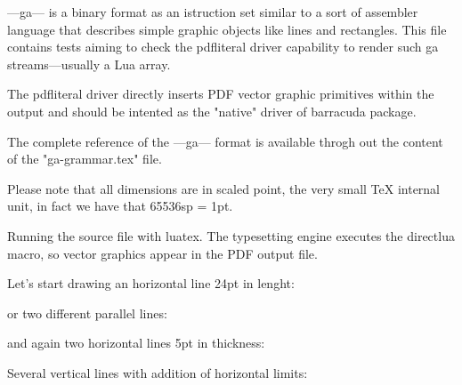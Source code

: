 %

---ga--- is a binary format as an istruction set similar to
a sort of assembler language that describes simple graphic
objects like lines and rectangles.
This file contains tests aiming to check the pdfliteral
driver capability to render such ga streams---usually a Lua
array.

The pdfliteral driver directly inserts PDF vector graphic
primitives within the output and should be intented as the
"native" driver of barracuda package.

The complete reference of the ---ga--- format is available
throgh out the content of the "ga-grammar.tex" file.

Please note that all dimensions are in scaled point, the
very small \TeX{} internal unit, in fact we have that
65536sp = 1pt.

Running the source file with luatex. The typesetting engine
executes the directlua macro, so vector graphics appear in
the PDF output file.

\newbox\mybox


Let's start drawing an horizontal line 24pt in lenght:
\box\mybox

or two different parallel lines:
\box\mybox

and again two horizontal lines 5pt in thickness:
\box\mybox

Several vertical lines with addition of horizontal limits:
\box\mybox

